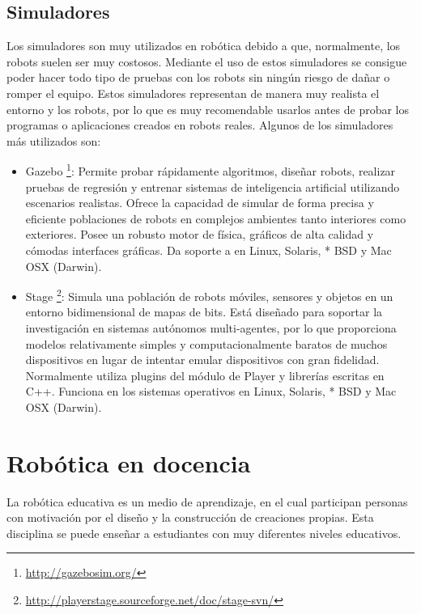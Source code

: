 \subsection{Simuladores}
Los simuladores son muy utilizados en robótica debido a que, normalmente, los robots suelen ser muy costosos. Mediante el uso de estos simuladores se consigue poder hacer todo tipo de pruebas con los robots sin ningún riesgo de dañar o romper el equipo. Estos simuladores representan de manera muy realista el entorno y los robots, por lo que es muy recomendable usarlos antes de probar los programas o aplicaciones creados en robots reales. Algunos de los simuladores más utilizados son:

\begin{itemize}
	\item Gazebo \footnote{\url{http://gazebosim.org/}}: Permite probar rápidamente algoritmos, diseñar robots, realizar pruebas de regresión y entrenar sistemas de inteligencia artificial utilizando escenarios realistas.  Ofrece la capacidad de simular de forma precisa y eficiente poblaciones de robots en complejos ambientes tanto interiores como exteriores. Posee un robusto motor de física, gráficos de alta calidad y cómodas interfaces gráficas. Da soporte a en Linux, Solaris, * BSD y Mac OSX (Darwin).
	
	\item Stage \footnote{\url{http://playerstage.sourceforge.net/doc/stage-svn/}}: Simula una población de robots móviles, sensores y objetos en un entorno bidimensional de mapas de bits. Está diseñado para soportar la investigación en sistemas autónomos multi-agentes, por lo que proporciona modelos relativamente simples y computacionalmente baratos de muchos dispositivos en lugar de intentar emular dispositivos con gran fidelidad. Normalmente utiliza plugins del módulo de Player y librerías escritas en C++. Funciona en los sistemas operativos en Linux, Solaris, * BSD y Mac OSX (Darwin).
\end{itemize}


\section{Robótica en docencia}
La robótica educativa es un medio de aprendizaje, en el cual participan personas con motivación por el diseño y la construcción de creaciones propias. Esta disciplina se puede enseñar a estudiantes con muy diferentes niveles educativos. \\

